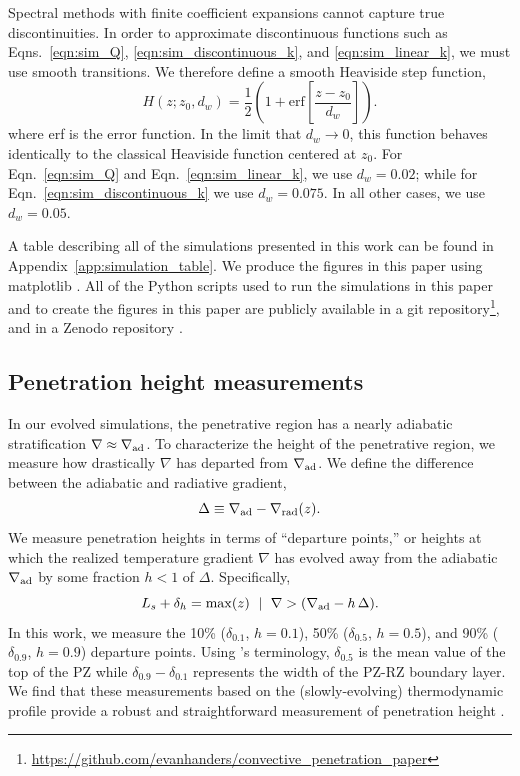\documentclass[twocolumn, linenumbers]{aastex631}
\newcommand{\gradrad}{\ensuremath{\nabla_{\rm{rad}}}}
\newcommand{\gradad}{\ensuremath{\nabla_{\rm{ad}}}}
\newcommand{\justgrad}{\ensuremath{\nabla}}
\newcommand{\editone}[1]{#1}
\begin{document}
Spectral methods with finite coefficient expansions cannot capture true discontinuities.
In order to approximate discontinuous functions such as Eqns.~\ref{eqn:sim_Q}, \ref{eqn:sim_discontinuous_k}, and \ref{eqn:sim_linear_k}, we must use smooth transitions.
We therefore define a smooth Heaviside step function,
\begin{equation}
H(z; z_0, d_w) = \frac{1}{2}\left(1 + \mathrm{erf}\left[\frac{z - z_0}{d_w}\right]\right).
\label{eqn:heaviside}
\end{equation}
where erf is the error function.
In the limit that $d_w \rightarrow 0$, this function behaves identically to the classical Heaviside function centered at $z_0$.
For Eqn.~\ref{eqn:sim_Q} and Eqn.~\ref{eqn:sim_linear_k}, we use $d_w = 0.02$; while for Eqn.~\ref{eqn:sim_discontinuous_k} we use $d_w = 0.075$.
In all other cases, we use $d_w = 0.05$.

A table describing all of the simulations presented in this work can be found in Appendix~\ref{app:simulation_table}.
We produce the figures in this paper using matplotlib \citep{hunter2007, mpl3.3.4}.
All of the Python scripts used to run the simulations in this paper and to create the figures in this paper are publicly available in a git repository\footnote{\url{https://github.com/evanhanders/convective_penetration_paper}}, and in a Zenodo repository \citep{supp}.

\subsection{Penetration height measurements}
In our evolved simulations, the penetrative region has a nearly adiabatic stratification $\justgrad \approx \gradad$.
To characterize the height of the penetrative region, we measure how drastically $\justgrad$ has departed from $\gradad$.
We define the difference between the adiabatic and radiative gradient,
\begin{equation}
\Delta \equiv \gradad - \gradrad(z).
\end{equation}
We measure penetration heights in terms of ``departure points,'' or heights at which the realized temperature gradient $\justgrad$ has evolved away from the adiabatic $\gradad$ by some fraction $h < 1$ of $\Delta$.
Specifically,
\begin{equation}
L_s + \delta_{h} = \mathrm{max}(z) \,\,\mid\,\, \justgrad > (\gradad - h\,\Delta).
\label{eqn:delta_p_measures}
\end{equation}
In this work, we measure the 10\% ($\delta_{0.1}$, $h=0.1$), 50\% ($\delta_{0.5}$, $h=0.5$), and 90\% ($\delta_{0.9}$, $h=0.9$) departure points.
Using \citet{zahn1991}'s terminology, $\delta_{0.5}$ is the mean value of the top of the PZ while $\delta_{0.9} - \delta_{0.1}$ represents the width of the \editone{PZ-RZ boundary layer}. 
We find that these measurements based on the (slowly-evolving) thermodynamic profile provide a robust and straightforward measurement of penetration height \citep[for a discussion of alternate measurement choices, see][]{pratt_etal_2017}.
\end{document}
